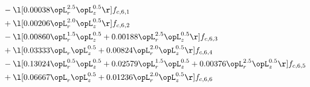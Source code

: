 \begin{alignat}{2}
& - \l[  0.00038 \opL_r^{2.5} \opL_z^{0.5}  \r] f_{c,6,1} \nonumber \\ 
& + \l[  0.00206 \opL_r^{2.0} \opL_z^{0.5}  \r] f_{c,6,2} \nonumber \\ 
& - \l[  0.00860 \opL_r^{1.5} \opL_z^{0.5} +  0.00188 \opL_r^{2.5} \opL_z^{0.5}  \r] f_{c,6,3} \nonumber \\ 
& + \l[  0.03333 \opL_r \opL_z^{0.5} +  0.00824 \opL_r^{2.0} \opL_z^{0.5}  \r] f_{c,6,4} \nonumber \\ 
& - \l[  0.13024 \opL_r^{0.5} \opL_z^{0.5} +  0.02579 \opL_r^{1.5} \opL_z^{0.5} +  0.00376 \opL_r^{2.5} \opL_z^{0.5}  \r] f_{c,6,5} \nonumber \\ 
& + \l[  0.06667 \opL_r \opL_z^{0.5} +  0.01236 \opL_r^{2.0} \opL_z^{0.5}  \r] f_{c,6,6} \nonumber \\ 
\end{alignat} 


